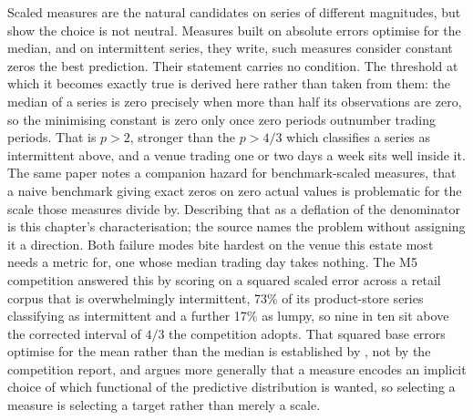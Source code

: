 Scaled measures are the natural candidates on series of different magnitudes, but
\citet{hewamalage_forecast_2023} show the choice is not neutral. Measures built
on absolute errors optimise for the median, and on intermittent series, they
write, such measures consider constant zeros the best prediction. Their statement
carries no condition. The threshold at which it becomes exactly true is derived
here rather than taken from them: the median of a series is zero precisely when
more than half its observations are zero, so the minimising constant is zero only
once zero periods outnumber trading periods. That is $p > 2$, stronger than the
$p > 4/3$ which classifies a series as intermittent above, and a venue trading
one or two days a week sits well inside it. The same paper notes a companion
hazard for benchmark-scaled measures, that a naive benchmark giving exact zeros
on zero actual values is problematic for the scale those measures divide by.
Describing that as a deflation of the denominator is this chapter's
characterisation; the source names the problem without assigning it a direction.
Both failure modes
bite hardest on the venue this estate most needs a metric for, one whose median
trading day takes nothing. The M5 competition
\citep{makridakis_m5_2022} answered this by scoring on a squared scaled error
across a retail corpus that is overwhelmingly intermittent, 73\% of its
product-store series classifying as intermittent and a further 17\% as lumpy, so
nine in ten sit above the corrected \citet{kostenko_note_2006} interval of $4/3$
the competition adopts. That squared base errors optimise for the mean rather
than the median is established by \citet{hewamalage_forecast_2023}, not by the
competition report, and \citet{kolassa_why_2020} argues more generally that a
measure encodes an implicit choice of which functional of the predictive
distribution is wanted, so selecting a measure is selecting a target rather than
merely a scale.

